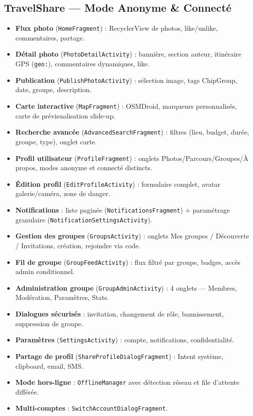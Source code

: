 \documentclass[a4paper,11pt]{article}
\begin{document}
\subsection{TravelShare — Mode Anonyme \& Connecté}
\begin{itemize}[leftmargin=1.5em, itemsep=2pt]
    \item \textbf{Flux photo} (\texttt{HomeFragment}) : RecyclerView de photos, like/unlike, commentaires, partage.
    \item \textbf{Détail photo} (\texttt{PhotoDetailActivity}) : bannière, section auteur, itinéraire GPS (\texttt{geo:}), commentaires dynamiques, like.
    \item \textbf{Publication} (\texttt{PublishPhotoActivity}) : sélection image, tags ChipGroup, date, groupe, description.
    \item \textbf{Carte interactive} (\texttt{MapFragment}) : OSMDroid, marqueurs personnalisés, carte de prévisualisation slide-up.
    \item \textbf{Recherche avancée} (\texttt{AdvancedSearchFragment}) : filtres (lieu, budget, durée, groupe, type), onglet carte.
    \item \textbf{Profil utilisateur} (\texttt{ProfileFragment}) : onglets Photos/Parcours/Groupes/À propos, modes anonyme et connecté distincts.
    \item \textbf{Édition profil} (\texttt{EditProfileActivity}) : formulaire complet, avatar galerie/caméra, zone de danger.
    \item \textbf{Notifications} : liste paginée (\texttt{NotificationsFragment}) + paramétrage granulaire (\texttt{NotificationSettingsActivity}).
    \item \textbf{Gestion des groupes} (\texttt{GroupsActivity}) : onglets Mes groupes / Découverte / Invitations, création, rejoindre via code.
    \item \textbf{Fil de groupe} (\texttt{GroupFeedActivity}) : flux filtré par groupe, badges, accès admin conditionnel.
    \item \textbf{Administration groupe} (\texttt{GroupAdminActivity}) : 4 onglets — Membres, Modération, Paramètres, Stats.
    \item \textbf{Dialogues sécurisés} : invitation, changement de rôle, bannissement, suppression de groupe.
    \item \textbf{Paramètres} (\texttt{SettingsActivity}) : compte, notifications, confidentialité.
    \item \textbf{Partage de profil} (\texttt{ShareProfileDialogFragment}) : Intent système, clipboard, email, SMS.
    \item \textbf{Mode hors-ligne} : \texttt{OfflineManager} avec détection réseau et file d'attente différée.
    \item \textbf{Multi-comptes} : \texttt{SwitchAccountDialogFragment}.
\end{itemize}
\end{document}
